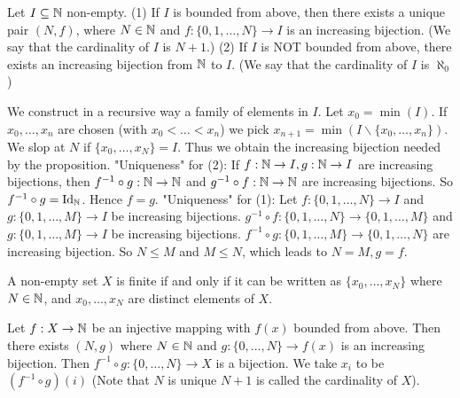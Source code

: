 \documentclass{book}
\numberwithin{equation}{section}
\begin{document}
\begin{propositionenv}
    Let $I\subseteq \mathbb{N}$ non-empty.
    \newline
    (1) If $I$ is bounded from above,  then there exists a unique pair $(N, f)$,  where $N\in \mathbb{N}$ and $f:\{0, 1, \dots, N\}\rightarrow I$ is an increasing bijection. (We say that the cardinality of $I$ is $N+1$.)
    \newline
    (2) If $I$ is NOT bounded from above,  there exists an increasing bijection from $\mathbb{N}$ to $I$. (We say that the cardinality of $I$ is $\aleph_0$) 
\end{propositionenv}
\begin{proofenv}
    \quad
    \newline
    We construct in a recursive way a family of elements in $I$. Let $x_0=\min(I)$. If $x_0, \dots , x_n$ are chosen (with $x_0<\dots<x_n$) we pick $x_{n+1}=\min(I\backslash\{x_0, \dots, x_n\})$. We slop at $N$ if $\{x_0, \dots, x_N\}=I$. Thus we obtain the increasing bijection needed by the proposition.
    \newline
    "Uniqueness" for (2): If $f:\mathbb{N}\rightarrow I, g:\mathbb{N}\rightarrow I$ are increasing bijections,  then $f^{-1}\circ g:\mathbb{N}\rightarrow\mathbb{N}$ and $g^{-1}\circ f:\mathbb{N}\rightarrow\mathbb{N}$ are increasing bijections. So $f^{-1}\circ g=\mathrm{Id}_{\mathbb{N}}$. Hence $f=g$.
    \newline
    "Uniqueness" for (1): Let $f:\{0, 1, \dots, N\}\rightarrow I$ and $g:\{0, 1, \dots, M\}\rightarrow I$ be increasing bijections. $g^{-1}\circ f:\{0, 1, \dots, N\}\rightarrow \{0, 1, \dots,  M\}$ and $g:\{0, 1, \dots, M\}\rightarrow I$ be increasing bijections. $f^{-1}\circ g:\{0, 1, \dots, M\}\rightarrow \{0, 1, \dots,  N\}$ are increasing bijection. So $N\le M$ and $M\le N$,  which leads to $N=M, g=f$. 
\end{proofenv}
\begin{corollaryenv}
    A non-empty set $X$ is finite if and only if it can be written as $\{x_0, \dots, x_N\}$ where $N\in \mathbb{N}$,  and $x_0, \dots, x_N$ are distinct elements of $X$.
\end{corollaryenv}
\begin{proofenv}
    Let $f:X\rightarrow \mathbb{N}$ be an injective mapping with $f(x)$ bounded from above. Then there exists $(N, g)$ where $N\in \mathbb{N}$ and $g:\{0, \dots , N\}\rightarrow f(x)$ is an increasing bijection. Then $f^{-1}\circ g:\{0, \dots, N\}\rightarrow X$ is a bijection. We take $x_i$ to be $(f^{-1}\circ g)(i)$ (Note that $N$ is unique $N+1$ is called the cardinality of $X$).
\end{proofenv}
\end{document}
